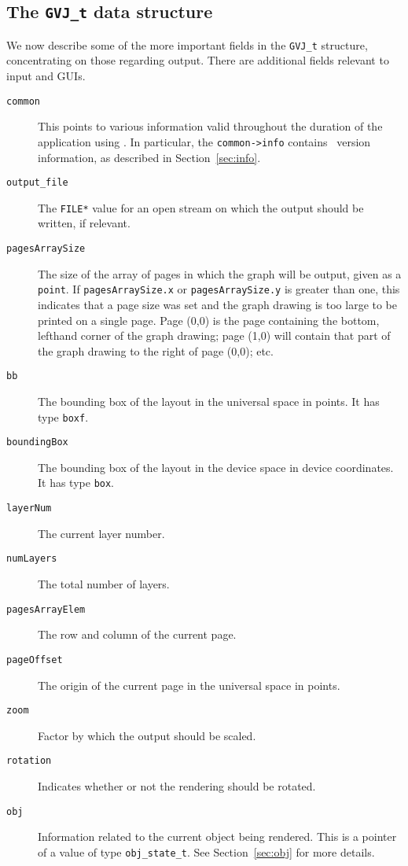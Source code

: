 \subsection{The {\tt GVJ\_t} data structure}
\label{sec:gvjfields}
We now describe some of the more important fields in the {\tt GVJ\_t} structure,
concentrating on those regarding output. There are additional fields
relevant to input and GUIs.
\begin{description}
\item[{\tt common}]
This points to various information valid throughout the duration
of the application using \gviz. In particular, 
the {\tt common->info} contains \gviz\ version
information, as described in Section~\ref{sec:info}.
\item[{\tt output\_file}]
The {\tt FILE*} value for an open stream on
which the output should be written, if relevant.
\item[{\tt pagesArraySize}]
The size of the array of pages in which the graph will be output,
given as a {\tt point}.
If {\tt pagesArraySize.x} or {\tt pagesArraySize.y} is greater than one, 
this indicates that a
page size was set and the graph drawing is too large to be printed on a
single page.
Page (0,0) is the page containing the bottom, lefthand corner
of the graph drawing; page (1,0) will contain that part of the graph
drawing to the right of page (0,0); etc. 
\item[{\tt bb}]
The bounding box of the layout in the universal space
in points. It has type {\tt boxf}.
\item[{\tt boundingBox}]
The bounding box of the layout in the device space in
device coordinates. It has type {\tt box}.
\item[{\tt layerNum}]
The current layer number.
\item[{\tt numLayers}]
The total number of layers.
\item[{\tt pagesArrayElem}]
The row and column of the current page.
\item[{\tt pageOffset}]
The origin of the current page in the universal space in points. 
\item[{\tt zoom}]
Factor by which the output should be scaled.
\item[{\tt rotation}]
Indicates whether or not the rendering should be rotated.
\item[{\tt obj}]
Information related to the current object being rendered.
This is a pointer of a value of type {\tt obj\_state\_t}.
See Section~\ref{sec:obj} for more details.
\end{description}

